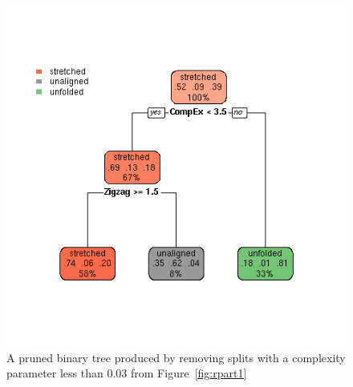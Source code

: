 %

\begin{figure}[!h]
  \centering
  \includegraphics[width=1.1\textwidth]{figrpart1p2.png}
  \caption{A pruned binary tree produced by removing splits with a complexity parameter less than $0.03$ from Figure~\ref{fig:rpart1}}
  \label{fig:rpart1p2}
\end{figure}

%

